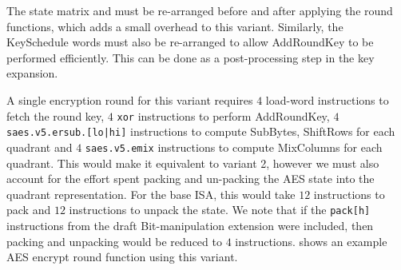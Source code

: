 The state matrix and must be re-arranged before and after applying
the round functions, which adds a small overhead to this variant.
Similarly, the KeySchedule words must also be re-arranged to allow
AddRoundKey to be performed efficiently.
This can be done as a post-processing step in the key expansion.

A single encryption round for this variant requires
$4$ load-word instructions to fetch the round key,
$4$ {\tt xor} instructions to perform AddRoundKey,
$4$ {\tt saes.v5.ersub.[lo|hi]} instructions to compute
    SubBytes, ShiftRows for each quadrant
and
$4$ {\tt saes.v5.emix} instructions to compute MixColumns for each
quadrant.
This would make it equivalent to variant 2, however we must also
account for the effort spent packing and un-packing the AES
state into the quadrant representation.
For the base ISA, this would take $12$ instructions to pack and
$12$ instructions to unpack the state.
We note that if the {\tt pack[h]} instructions from the draft
Bit-manipulation extension were included, then packing and unpacking
would be reduced to $4$ instructions.
 shows an example AES encrypt round function
using this variant.


